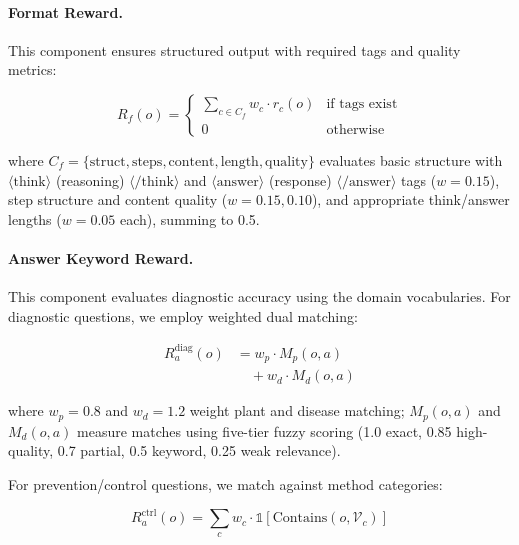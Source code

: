 \documentclass[11pt]{article}
\begin{document}
\paragraph{Format Reward.}
This component ensures structured output with required tags and quality metrics:

\begin{equation}
R_f(o) = \begin{cases}
\sum_{c \in C_f} w_c \cdot r_c(o) & \text{if tags exist} \\
0 & \text{otherwise}
\end{cases}
\label{eq:format_reward}
\end{equation}

\noindent where $C_f = \{\text{struct}, \text{steps}, \text{content}, \text{length}, \text{quality}\}$ evaluates basic structure with $\langle\text{think}\rangle$ (reasoning) $\langle/\text{think}\rangle$ and $\langle\text{answer}\rangle$ (response) $\langle/\text{answer}\rangle$ tags ($w=0.15$), step structure and content quality ($w=0.15, 0.10$), and appropriate think/answer lengths ($w=0.05$ each), summing to 0.5.

\paragraph{Answer Keyword Reward.}
This component evaluates diagnostic accuracy using the domain vocabularies. For diagnostic questions, we employ weighted dual matching:

\begin{equation}
\begin{aligned}
R_a^{\text{diag}}(o) &= w_p \cdot M_p(o, a) \\
&\quad + w_d \cdot M_d(o, a)
\end{aligned}
\label{eq:answer_diag}
\end{equation}

\noindent where $w_p=0.8$ and $w_d=1.2$ weight plant and disease matching; $M_p(o, a)$ and $M_d(o, a)$ measure matches using five-tier fuzzy scoring (1.0 exact, 0.85 high-quality, 0.7 partial, 0.5 keyword, 0.25 weak relevance).

For prevention/control questions, we match against method categories:

\begin{equation}
R_a^{\text{ctrl}}(o) = \sum_{c} w_c \cdot \mathds{1}[\text{Contains}(o, \mathcal{V}_c)]
\label{eq:control_reward}
\end{equation}
\end{document}
